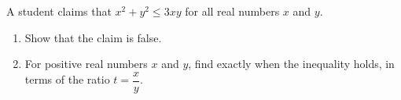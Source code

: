 A student claims that $x^2+y^2\le3xy$ for all real numbers $x$ and $y$.
\begin{enumerate}
\item[(a)] Show that the claim is false.
\item[(b)] For positive real numbers $x$ and $y$, find exactly when the inequality holds, in terms of the ratio $t=\dfrac {x}{y}$.
\end{enumerate}
